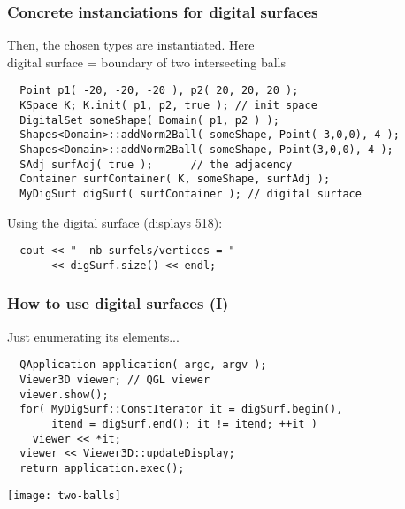 \documentclass[pdftex,francais]{beamer}
\begin{document}
\begin{frame}[fragile]%
  \frametitle{Concrete instanciations for digital surfaces}

  Then, the chosen types are instantiated. Here \\
  digital surface = boundary of two intersecting balls
  \begin{lstlisting}
  Point p1( -20, -20, -20 ), p2( 20, 20, 20 );
  KSpace K; K.init( p1, p2, true ); // init space
  DigitalSet someShape( Domain( p1, p2 ) );
  Shapes<Domain>::addNorm2Ball( someShape, Point(-3,0,0), 4 );
  Shapes<Domain>::addNorm2Ball( someShape, Point(3,0,0), 4 );
  SAdj surfAdj( true );      // the adjacency
  Container surfContainer( K, someShape, surfAdj );
  MyDigSurf digSurf( surfContainer ); // digital surface
  \end{lstlisting}
  
  Using the digital surface (displays 518):
  \begin{lstlisting}
  cout << "- nb surfels/vertices = "
       << digSurf.size() << endl;
  \end{lstlisting}
  

\end{frame}

\begin{frame}[fragile]%
  \frametitle{How to use digital surfaces (I)}

  Just enumerating its elements...
  \begin{lstlisting}
  QApplication application( argc, argv );
  Viewer3D viewer; // QGL viewer
  viewer.show(); 
  for( MyDigSurf::ConstIterator it = digSurf.begin(),
	   itend = digSurf.end(); it != itend; ++it )
    viewer << *it;
  viewer << Viewer3D::updateDisplay;
  return application.exec();
  \end{lstlisting}

  \texttt{[image: two-balls]}
\end{frame}
\end{document}
